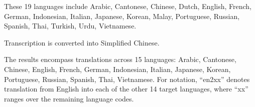 \begin{table}[H]
{\begin{threeparttable}
\begin{tablenotes} 
    \item[a] These 19 languages include Arabic, Cantonese, Chinese, Dutch, English, French, German, Indonesian, Italian, Japanese, Korean, Malay, Portuguese, Russian, Spanish, Thai, Turkish, Urdu, Vietnamese.
    \item[b] Transcription is converted into Simplified Chinese.
    \item[c] The results encompass translations across 15 languages: Arabic, Cantonese, Chinese, English, French, German, Indonesian, Italian, Japanese, Korean, Portuguese, Russian, Spanish, Thai, Vietnamese. For notation, ``en2xx'' denotes translation from English into each of the other 14 target languages, where ``xx'' ranges over the remaining language codes.
\end{tablenotes}
\end{threeparttable}
}
\end{table}